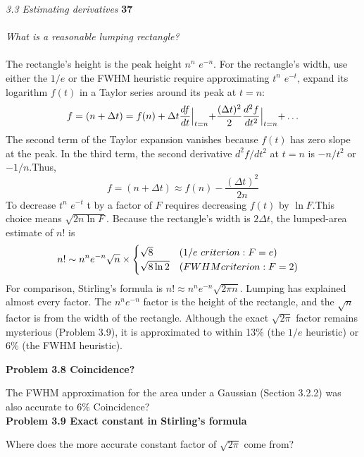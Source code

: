 \documentclass[a4paper, 12pt]{book}
\begin{document}
    \noindent
    \large\textit{ 3.3 Estimating derivatives} \hfill \textbf{37} \\
    \\
    {\it What is a reasonable lumping rectangle?}\\
    \\
    The rectangle’s height is the peak height $n^n$ $e^{-n}$.
    For the rectangle’s width, use either the $1/e$ or
    the FWHM heuristic require approximating $t^n$ $e^{-t}$, expand its logarithm $f(t)$ in a Taylor series around its peak at $t=n$:
    \begin{equation}f=(n+\Delta t)=f(n)+\Delta t\frac{df}{dt}\Bigl|_{t=n}+\frac{(\Delta t)^2}{2}\frac{d^2f}{dt^2}\Bigl|_{t=n}+\ldots\end{equation}
    The second term of the Taylor expansion vanishes because $f(t)$ has zero slope at the peak. In the third term, the second derivative $d^2f/dt^2$ at $t=n$ is $-n/t^2$ or $-1/n$.Thus,
    \begin{equation}f=(n+\Delta t)\approx f(n)-\frac{(\Delta t)^2}{2n}\end{equation}
    To decrease $t^n$ $e^{-t}$ t by a factor of $F$ requires decreasing $f(t)$ by $\ln F$.This choice means $\sqrt{2n\ln F}$. Because the rectangle’s width is $2\Delta t$, the
    lumped-area estimate of ${n!}$ is
    \begin{equation}\\{n!}\sim n^n e^{-n} \sqrt{n}\times
    \begin{cases}
    \sqrt{8}~~~~~~~~\text{$(1/e~ criterion: F=e)$} \\
    \sqrt{8\ln 2}~~~\text{$(FWHM criterion: F=2)$}
    \end{cases}
    \end{equation}
    For comparison, Stirling’s formula is $n!\approx n^n e^{-n} \sqrt{2\pi n}$. Lumping has explained almost every factor. The $n^n e^{-n}$ factor is the height of the rectangle,
    and the $\sqrt{n}$ factor is from the width of the rectangle. Although the exact $\sqrt{2\pi}$ factor remains mysterious (Problem 3.9), it is approximated to within 13\% (the $1/e$ heuristic) or 6\% (the FWHM heuristic).\\

    \colorbox{light-gray}{
    \begin{minipage}{\textwidth}
    \large\textbf{Problem 3.8 Coincidence?}

    The FWHM approximation for the area under a Gaussian (Section 3.2.2) was also accurate to $6\%$ Coincidence?\\

    \large\textbf{Problem 3.9 Exact constant in Stirling’s formula}

    Where does the more accurate constant factor of $\sqrt{2\pi}$ come from?\end{minipage}}
    \\
\end{document}
